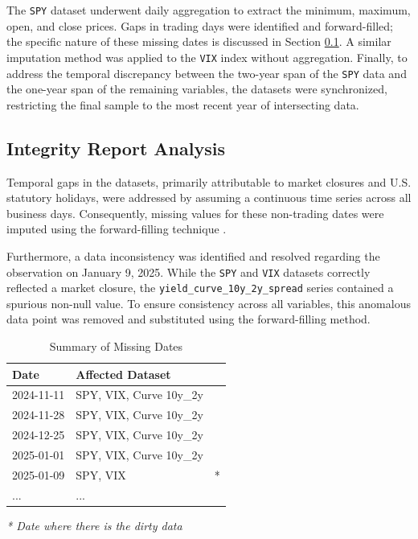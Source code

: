\documentclass[a4paper,fleqn]{cas-dc} %
\begin{document}
The \texttt{SPY} dataset underwent daily aggregation to extract the minimum, maximum, open, and close prices. Gaps in trading days were identified and forward-filled; the specific nature of these missing dates is discussed in Section \ref{sec:integrity_analysis}. A similar imputation method was applied to the \texttt{VIX} index without aggregation. Finally, to address the temporal discrepancy between the two-year span of the \texttt{SPY} data and the one-year span of the remaining variables, the datasets were synchronized, restricting the final sample to the most recent year of intersecting data.

\subsection{Integrity Report Analysis} \label{sec:integrity_analysis}
Temporal gaps in the datasets, primarily attributable to market closures and U.S. statutory holidays, were addressed by assuming a continuous time series across all business days. Consequently, missing values for these non-trading dates were imputed using the forward-filling technique \cite{team1_validation}.

Furthermore, a data inconsistency was identified and resolved regarding the observation on January 9, 2025. While the \texttt{SPY} and \texttt{VIX} datasets correctly reflected a market closure, the \texttt{yield\_curve\_10y\_2y\_spread} series contained a spurious non-null value. To ensure consistency across all variables, this anomalous data point was removed and substituted using the forward-filling method.

\begin{table}[htbp]
  \caption{Summary of Missing Dates}
  \label{tab:integrity_report}
  \centering
  \begin{tabular}{llc}
    \toprule
    \textbf{Date} & \textbf{Affected Dataset} & \\
    \midrule
    2024-11-11 & SPY, VIX, Curve 10y\_2y  & \\
    2024-11-28 & SPY, VIX, Curve 10y\_2y & \\
    2024-12-25 & SPY, VIX, Curve 10y\_2y & \\
    2025-01-01 & SPY, VIX, Curve 10y\_2y & \\
    2025-01-09 & SPY, VIX  & * \\
    ... & ... & \\
    \bottomrule
  \end{tabular}
  \par\bigskip
  \footnotesize{\textit{* Date where there is the dirty data}}
\end{table}
\end{document}
